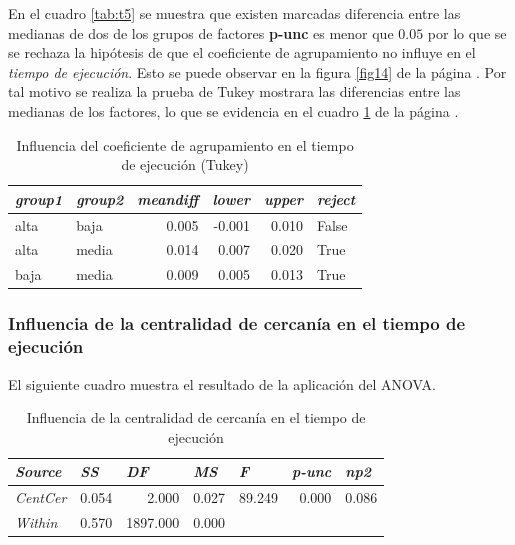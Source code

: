 \documentclass{article}
\begin{document}
En el cuadro \ref{tab:t5} se muestra que existen marcadas diferencia entre las medianas de dos de los grupos de factores {\bf p-unc} es menor que $0.05$ por lo que se se rechaza la hipótesis de que el coeficiente de agrupamiento no influye en el \textit{tiempo de ejecución}. Esto se puede observar en la figura \ref{fig14} de la página \pageref{fig14}. Por tal motivo se realiza la prueba de Tukey mostrara las diferencias entre las medianas de los factores, lo que se evidencia en el cuadro \ref{tab:t6} de la página \pageref{tab:t6}.

\begin{table}[htbp]
  \centering
  \caption{Influencia del coeficiente de agrupamiento en el tiempo de ejecución (Tukey)}
    \begin{tabular}{llrrrl}
    \toprule
    \textit{\textbf{group1}} & \textit{\textbf{group2}} & \multicolumn{1}{l}{\textit{\textbf{meandiff}}} & \multicolumn{1}{l}{\textit{\textbf{lower}}} & \multicolumn{1}{l}{\textit{\textbf{upper}}} & \textit{\textbf{reject}} \\
    \midrule
    alta  & baja  & 0.005 & -0.001 & 0.010 & False \\
    alta  & media & 0.014 & 0.007 & 0.020 & True \\
    baja  & media & 0.009 & 0.005 & 0.013 & True \\
    \bottomrule
    \end{tabular}%
  \label{tab:t6}%
\end{table}%

\newpage
\subsubsection{Influencia de la centralidad de cercanía en el tiempo de ejecución}

El siguiente cuadro muestra el resultado de la aplicación del ANOVA.

\begin{table}[htbp]
  \centering
  \caption{Influencia de la centralidad de cercanía en el tiempo de ejecución}
    \begin{tabular}{lrrrrrr}
    \toprule
    \textit{\textbf{Source}} & \multicolumn{1}{l}{\textit{\textbf{SS}}} & \multicolumn{1}{l}{\textit{\textbf{DF}}} & \multicolumn{1}{l}{\textit{\textbf{MS}}} & \multicolumn{1}{l}{\textit{\textbf{F}}} & \multicolumn{1}{l}{\textit{\textbf{p-unc}}} & \multicolumn{1}{l}{\textit{\textbf{np2}}} \\
    \midrule
    \textit{CentCer} & 0.054 & 2.000 & 0.027 & 89.249 & 0.000 & 0.086 \\
    \textit{Within} & 0.570 & 1897.000 & 0.000 &       &       &  \\
    \bottomrule
    \end{tabular}%
  \label{tab:t7}%
\end{table}%
\end{document}
